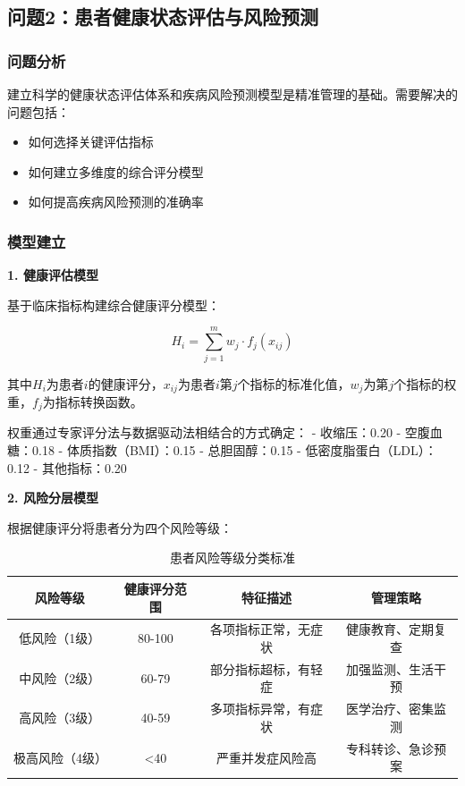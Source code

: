 \subsection{问题2：患者健康状态评估与风险预测}

\subsubsection{问题分析}

建立科学的健康状态评估体系和疾病风险预测模型是精准管理的基础。需要解决的问题包括：
\begin{itemize}[itemindent=2em]
\item 如何选择关键评估指标
\item 如何建立多维度的综合评分模型
\item 如何提高疾病风险预测的准确率
\end{itemize}

\subsubsection{模型建立}

\textbf{1. 健康评估模型}

基于临床指标构建综合健康评分模型：

$$H_i = \sum_{j=1}^{m} w_j \cdot f_j(x_{ij})$$

其中$H_i$为患者$i$的健康评分，$x_{ij}$为患者$i$第$j$个指标的标准化值，$w_j$为第$j$个指标的权重，$f_j$为指标转换函数。

权重通过专家评分法与数据驱动法相结合的方式确定：
- 收缩压：0.20
- 空腹血糖：0.18
- 体质指数（BMI）：0.15
- 总胆固醇：0.15
- 低密度脂蛋白（LDL）：0.12
- 其他指标：0.20

\textbf{2. 风险分层模型}

根据健康评分将患者分为四个风险等级：

\begin{table}[H]
  \centering
  \caption{患者风险等级分类标准}
  \label{tab:risk_levels}
  \begin{tabularx}{\textwidth}{CCCC}
    \toprule
    风险等级 & 健康评分范围 & 特征描述 & 管理策略 \\
    \midrule
    低风险（1级） & 80-100 & 各项指标正常，无症状 & 健康教育、定期复查 \\
    中风险（2级） & 60-79 & 部分指标超标，有轻症 & 加强监测、生活干预 \\
    高风险（3级） & 40-59 & 多项指标异常，有症状 & 医学治疗、密集监测 \\
    极高风险（4级） & <40 & 严重并发症风险高 & 专科转诊、急诊预案 \\
    \bottomrule
  \end{tabularx}
\end{table}

